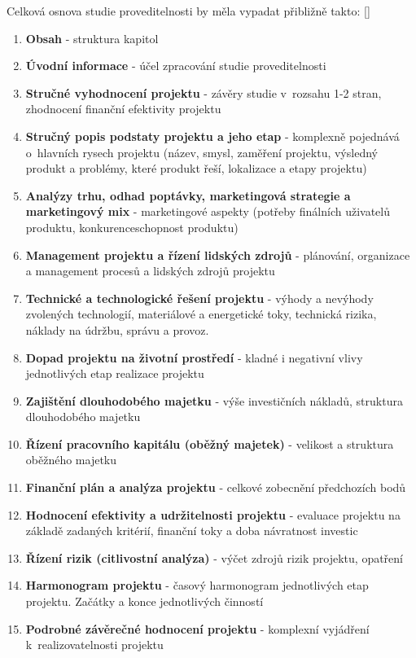 \documentclass[
	11pt, oneside, printed, final, palatino, monochrome
	microtype,
	table,   %
	lof,     %
	lot     %
]{fithesis3}
\newcommand{\citepages}[2]{[\cite[#1]{#2}]}
\newcommand{\bold}[1]{\textbf{#1}}
\newcommand{\mezera}{\bigskip}
\begin{document}
{Celková osnova studie proveditelnosti by měla vypadat přibližně takto: \citepages{8-14}{Sieber2004} 
\mezera
\begin{enumerate}
\item \bold{Obsah} - struktura kapitol
\item \bold{Úvodní informace} - účel zpracování studie proveditelnosti
\item \bold{Stručné vyhodnocení projektu} - závěry studie v~rozsahu 1-2 stran, zhodnocení finanční efektivity projektu
\item \bold{Stručný popis podstaty projektu a jeho etap} - komplexně pojednává o~hlavních rysech projektu (název, smysl, zaměření projektu, výsledný produkt a problémy, které produkt řeší, lokalizace a etapy projektu)
\item \bold{Analýzy trhu, odhad poptávky, marketingová strategie a marketingový mix} - marketingové aspekty (potřeby finálních uživatelů produktu, konkurenceschopnost produktu)
\item \bold{Management projektu a řízení lidských zdrojů} - plánování, organizace a management procesů a lidských zdrojů projektu 
\item \bold{Technické a technologické řešení projektu} - výhody a nevýhody zvolených technologií, materiálové a energetické toky, technická rizika, náklady na údržbu, správu a provoz.
\item \bold{Dopad projektu na životní prostředí} - kladné i negativní vlivy jednotlivých etap realizace projektu
\item \bold{Zajištění dlouhodobého majetku} - výše investičních nákladů, struktura dlouhodobého majetku
\item \bold{Řízení pracovního kapitálu (oběžný majetek)} - velikost a struktura oběžného majetku
\item \bold{Finanční plán a analýza projektu} - celkové zobecnění předchozích bodů
\item \bold{Hodnocení efektivity a udržitelnosti projektu} - evaluace projektu na základě zadaných kritérií, finanční toky a doba návratnost investic
\item \bold{Řízení rizik (citlivostní analýza)} - výčet zdrojů rizik projektu, opatření
\item \bold{Harmonogram projektu} - časový harmonogram jednotlivých etap projektu. Začátky a konce jednotlivých činností
\item \bold{Podrobné závěrečné hodnocení projektu} - komplexní vyjádření k~realizovatelnosti projektu
\end{enumerate}

}
\end{document}
